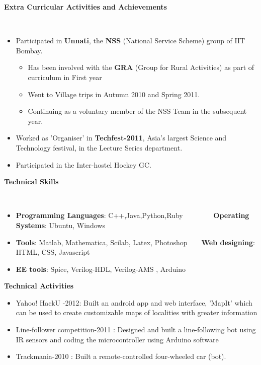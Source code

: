 \documentclass[a4paper,11pt]{article}
\newcommand{\lsep}{-0.5cm}
\newcommand{\resheading}[1]{{\small \colorbox{mygrey}{\begin{minipage}{0.975\textwidth}{\textbf{#1 \vphantom{p\^{E}}}}\end{minipage}}}}
\begin{document}
\resheading{\textbf{\large Extra Curricular Activities and Achievements}}\\[\lsep]
\begin{itemize}
  \item Participated in \textbf{Unnati}, the \textbf{NSS} (National Service Scheme) group of IIT Bombay.
	\begin{itemize}
	 \item Has been involved with the \textbf{GRA} (Group for Rural Activities) as part of curriculum in First year\\[-0.6cm]
	 \item Went to Village trips in Autumn 2010 and Spring 2011.
	 \item Continuing as a voluntary member of the NSS Team in the subsequent year.
	  \end{itemize}
  \item Worked as 'Organiser' in \textbf{Techfest-2011}, Asia's largest Science and Technology festival, in the Lecture Series department. \\[-0.6cm]
  \item Participated in the Inter-hostel Hockey GC. 
\end{itemize}

\resheading{\textbf{\large Technical Skills}}\\[\lsep]
\begin{itemize}
   \item \textbf{Programming Languages}: C++,Java,Python,Ruby \  \ \ \ \ \ \ \  \textbf{Operating Systems}: Ubuntu, Windows\\[-0.6cm]
  \item \textbf{Tools}: Matlab, Mathematica, Scilab, Latex, Photoshop\ \ \ \  \textbf{Web designing}: HTML, CSS, Javascript\\[-0.6cm]
  \item \textbf{EE tools}: Spice, Verilog-HDL, Verilog-AMS , Arduino
\end{itemize}

\resheading{\textbf{\large Technical Activities}}
\begin{itemize}
\item Yahoo! HackU -2012: Built an android app and web interface, 'MapIt' which can be used to create customizable maps of localities with greater information\\[-0.7cm]
 \item Line-follower competition-2011 : Designed and built a line-following bot using IR sensors and coding the microcontroller using Arduino software\\[-0.7cm]
\item Trackmania-2010 : Built a remote-controlled four-wheeled car (bot).
\end{itemize}
\end{document}
